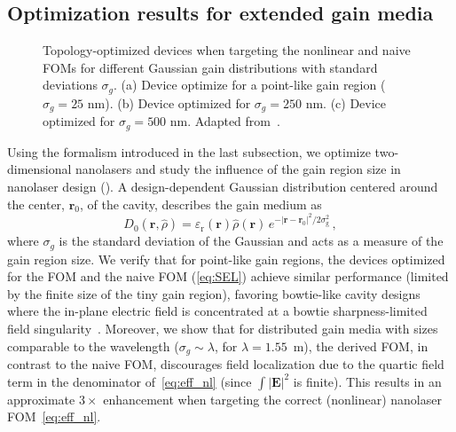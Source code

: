 \subsection*{Optimization results for extended gain media}

\begin{figure}[tb]
    \centering
    \caption{Topology-optimized devices when targeting the nonlinear and naive FOMs for different Gaussian gain distributions with standard deviations $\sigma_g$. (a) Device optimize for a point-like gain region ($\sigma_g=25$ nm).
    (b) Device optimized for $\sigma_g=250$ nm. (c) Device optimized for $\sigma_g=500$ nm. Adapted from~\cite{ownpub4}.}
    \label{fig:laser_size}
\end{figure}

Using the formalism introduced in the last subsection, we optimize two-dimensional nanolasers and study the influence of the gain region size in 
nanolaser design (). A design-dependent Gaussian distribution centered around the center, $\mathbf{r}_0$, of the cavity, describes the gain medium as
\begin{equation}
D_0 (\mathbf{r}, \hat{\rho}) = \varepsilon_{\text{r}}(\mathbf{r})  \hat{\rho}(\mathbf{r}) \, e^{- \vert \mathbf{r}- \mathbf{r}_0 \vert^2 / 2 \sigma_{\text{g}}^2 }\,,
\end{equation}
where
$\sigma_g$ is the standard deviation of the Gaussian and acts as a measure of the gain region size. We verify that for point-like gain regions, the devices optimized for the FOM and the naive FOM (\eqref{eq:SEL})
achieve similar performance (limited by the finite size of the tiny gain region), favoring bowtie-like cavity designs
where the in-plane electric field is concentrated at a bowtie sharpness-limited field singularity~\cite{sing}. Moreover, we show that for distributed gain media with sizes comparable to the wavelength 
($\sigma_g \sim \lambda$, for $\lambda = 1.55$~\textmu m), 
the derived FOM, in contrast to the naive FOM, discourages field localization due to the quartic field term in the denominator of~\eqref{eq:eff_nl} 
(since $\int |\mathbf{E}|^2$ is finite). 
This results in an approximate $3\times$ enhancement when targeting the correct (nonlinear) nanolaser FOM~\eqref{eq:eff_nl}.

